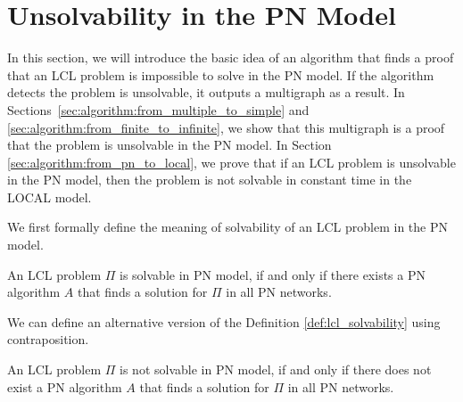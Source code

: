 
\section{Unsolvability in the PN Model} \label{sec:algorithm}

In this section, we will introduce the basic idea of an algorithm that finds a proof that an LCL problem is impossible to solve in the PN model.
If the algorithm detects the problem is unsolvable, it outputs a multigraph as a result.
In Sections~\ref{sec:algorithm:from_multiple_to_simple} and \ref{sec:algorithm:from_finite_to_infinite}, we show that this multigraph is a proof that the problem is unsolvable in the PN model.
In Section \ref{sec:algorithm:from_pn_to_local}, we prove that if an LCL problem is unsolvable in the PN model, then the problem is not solvable in constant time in the LOCAL model.

%
We first formally define the meaning of solvability of an LCL problem in the PN model.
\begin{definition} \label{def:lcl_solvability}
    An LCL problem $\Pi$ is solvable in PN model, if and only if there exists a PN algorithm $A$ that finds a solution for $\Pi$ in all PN networks.
\end{definition}

We can define an alternative version of the Definition \ref{def:lcl_solvability} using contraposition.
\begin{corollary} \label{cor:lcl_solvability:contrapositive}
An LCL problem $\Pi$ is not solvable in PN model, if and only if there does not exist a PN algorithm $A$ that finds a solution for $\Pi$ in all PN networks.
\end{corollary}

